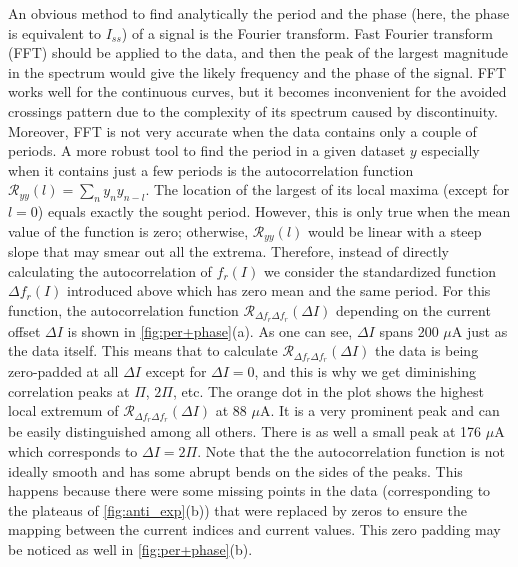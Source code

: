 \documentclass[%
 aip,
 draft,
 amsmath,amssymb,
 reprint,%
]{revtex4-1}
\begin{document}
An obvious method to find analytically the period and the phase (here, the phase is equivalent to $I_{ss}$) of a signal is the Fourier transform. Fast Fourier transform (FFT) should be applied to the data, and then the peak of the largest magnitude in the spectrum would give the likely frequency and the phase of the signal. FFT works well for the continuous curves, but it becomes inconvenient for the avoided crossings pattern due to the complexity of its spectrum caused by discontinuity. Moreover, FFT is not very accurate when the data contains only a couple of periods. A more robust tool to find the period in a given dataset $y$ especially when it contains just a few periods is the autocorrelation function $\mathcal{R}_{y y}(l) = \sum_n y_n y_{n-l}$. The location of the largest of its local maxima (except for $l=0$) equals exactly the sought period\cite{parthasarathy2006}. However, this is only true when the mean value of the function is zero; otherwise, $\mathcal{R}_{y y}(l)$ would be linear with a steep slope that may smear out all the extrema. Therefore, instead of directly calculating the autocorrelation of $f_r (I)$ we consider the standardized function $\Delta f_r (I)$ introduced above which has zero mean and the same period. For this function, the autocorrelation function $\mathcal{R}_{\Delta f_r \Delta f_r}(\Delta I)$ depending on the current offset $\Delta I$ is shown in \autoref{fig:per+phase}(a). As one can see, $\Delta I$ spans 200 $\mu$A just as the data itself. This means that to calculate $\mathcal{R}_{\Delta f_r \Delta f_r}(\Delta I)$ the data is being zero-padded at all $\Delta I$ except for $\Delta I = 0$, and this is why we get diminishing correlation peaks at $\Pi$, $2\Pi$, etc. The orange dot in the plot shows the highest local extremum of $\mathcal{R}_{\Delta f_r \Delta f_r}(\Delta I)$ at 88 $\mu$A. It is a very prominent peak and can be easily distinguished among all others. There is as well a small peak at 176 $\mu$A which corresponds to $\Delta I = 2\Pi$. Note that the the autocorrelation function is not ideally smooth and has some abrupt bends on the sides of the peaks. This happens because there were some missing points in the data (corresponding to the plateaus of \autoref{fig:anti_exp}(b)) that were replaced by zeros to ensure the  mapping between the current indices and current values. This zero padding may be noticed as well in \autoref{fig:per+phase}(b).
\end{document}
